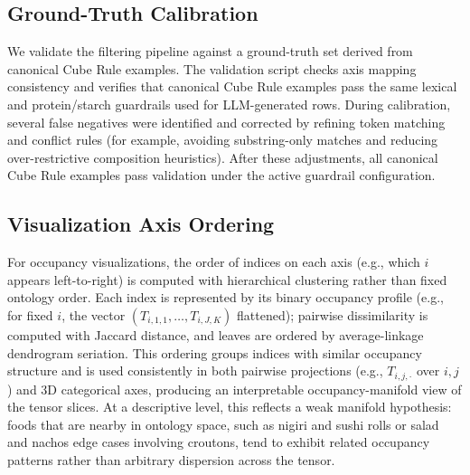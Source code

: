 \subsection{Ground-Truth Calibration}

We validate the filtering pipeline against a ground-truth set derived from canonical Cube Rule examples.
The validation script checks axis mapping consistency and verifies that canonical Cube Rule examples pass the same lexical and protein/starch guardrails used for LLM-generated rows.
During calibration, several false negatives were identified and corrected by refining token matching and conflict rules (for example, avoiding substring-only matches and reducing over-restrictive composition heuristics).
After these adjustments, all canonical Cube Rule examples pass validation under the active guardrail configuration.

\subsection{Visualization Axis Ordering}

For occupancy visualizations, the order of indices on each axis (e.g., which $i$ appears left-to-right) is computed with hierarchical clustering rather than fixed ontology order.
Each index is represented by its binary occupancy profile (e.g., for fixed $i$, the vector $(T_{i,1,1}, \ldots, T_{i,J,K})$ flattened); pairwise dissimilarity is computed with Jaccard distance, and leaves are ordered by average-linkage dendrogram seriation.
This ordering groups indices with similar occupancy structure and is used consistently in both pairwise projections (e.g., $T_{i,j,\cdot}$ over $i,j$) and 3D categorical axes, producing an interpretable occupancy-manifold view of the tensor slices.
At a descriptive level, this reflects a weak manifold hypothesis: foods that are nearby in ontology space, such as nigiri and sushi rolls or salad and nachos edge cases involving croutons, tend to exhibit related occupancy patterns rather than arbitrary dispersion across the tensor.
